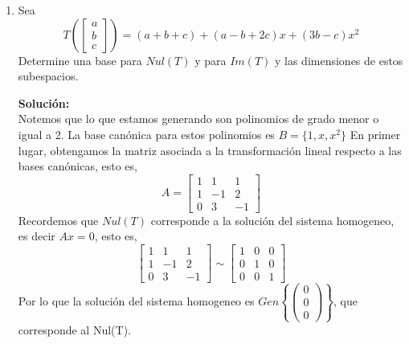 \documentclass[12pt]{article}
\newenvironment{solucion}
{\begin{mdframed}[backgroundcolor=black!10]
		{\bf Solución:}\\
	}
	{
	\end{mdframed}
}
\newenvironment{preguntas}
{\begin{enumerate}\itemsep12pt
	}
	{
	\end{enumerate}
}
\begin{document}
\begin{preguntas}
\begin{solucion}
\begin{enumerate}[a)]
			$$p_1(t) = (1,0,0)$$
			$$f(t) = (8,-15,10)$$
			$$g(t) = (4,-7,4)$$
			Armamos una matriz con ellos y pivoteamos,
			$$\begin{bmatrix}
			1 & 0 & 0 \\
			8 & -15 & 10 \\
			4 & -7 & 4
			\end{bmatrix}
			\sim
			\begin{bmatrix}
			1 & 0 & 0 \\
			0 & 1 & 0 \\
			0 & 0 & 1
			\end{bmatrix}$$
			Por lo que sus el conjunto $\{p_1(t), f(t), g(t)\}$ es $L.I.$
\end{enumerate}
\end{solucion}
\item Sea
$$T\left(\left[ \begin{array}{c}
a\\ b\\ c \end{array} \right] \right) = (a+b+c) + (a-b+2c)x +
(3b-c)x^2
$$
Determine una base para $Nul(T) $ y para $Im (T) $ y las dimensiones de estos subespacios.
\begin{solucion}
Notemos que lo que estamos generando son polinomios de grado menor o igual a 2. La base canónica para estos polinomios es $B=\{1, x, x^2\}$
En primer lugar, obtengamos la matriz asociada a la transformación lineal respecto a las bases canónicas, esto es,
$$A = \begin{bmatrix}
1 & 1 & 1 \\
1 & -1 & 2 \\
0 & 3 & -1
\end{bmatrix}$$
Recordemos que $Nul(T)$ corresponde a la solución del sistema homogeneo, es decir $Ax = 0$, esto es,
$$\begin{bmatrix}
1 & 1 & 1 \\
1 & -1 & 2 \\
0 & 3 & -1
\end{bmatrix} \sim 
\begin{bmatrix}
1 & 0 & 0 \\
0 & 1 & 0 \\
0 & 0 & 1
\end{bmatrix}$$
Por lo que la solución del sistema homogeneo es $Gen\left\{\begin{pmatrix}0 \\ 0 \\ 0 \end{pmatrix}\right\}$, que corresponde al Nul(T).\\


\end{solucion}
\end{preguntas}
\end{document}
